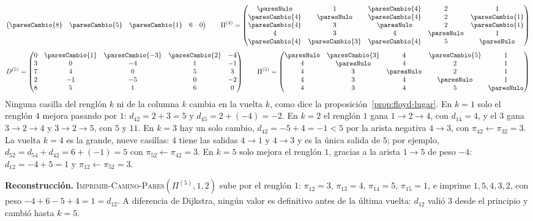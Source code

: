 \documentclass[11pt,letterpaper]{article}
\begin{document}
\begin{ejemplo}
{\[\begin{pmatrix}
    \paresCambio{8} & \paresCambio{5} & \paresCambio{1} & 6 & 0
  \end{pmatrix}
  \qquad
  \Pi^{(4)} = \begin{pmatrix}
    \paresNulo & 1 & \paresCambio{4} & 2 & 1 \\
    \paresCambio{4} & \paresNulo & \paresCambio{4} & 2 & \paresCambio{1} \\
    \paresCambio{4} & 3 & \paresNulo & 2 & \paresCambio{1} \\
    4 & 3 & 4 & \paresNulo & 1 \\
    \paresCambio{4} & \paresCambio{3} & \paresCambio{4} & 5 & \paresNulo
  \end{pmatrix}
  \]
  \[
  D^{(5)} = \begin{pmatrix}
    0 & \paresCambio{1} & \paresCambio{-3} & \paresCambio{2} & -4 \\
    3 & 0 & -4 & 1 & -1 \\
    7 & 4 & 0 & 5 & 3 \\
    2 & -1 & -5 & 0 & -2 \\
    8 & 5 & 1 & 6 & 0
  \end{pmatrix}
  \qquad
  \Pi^{(5)} = \begin{pmatrix}
    \paresNulo & \paresCambio{3} & 4 & \paresCambio{5} & 1 \\
    4 & \paresNulo & 4 & 2 & 1 \\
    4 & 3 & \paresNulo & 2 & 1 \\
    4 & 3 & 4 & \paresNulo & 1 \\
    4 & 3 & 4 & 5 & \paresNulo
  \end{pmatrix}
  \]
  }%
  Ninguna casilla del renglón $k$ ni de la columna $k$ cambia en la
  vuelta $k$, como dice la proposición~\ref{prop:floyd-lugar}. En
  $k = 1$ solo el renglón $4$ mejora pasando por $1$:
  $d_{42} = 2 + 3 = 5$ y $d_{45} = 2 + (-4) = -2$. En $k = 2$ el
  renglón $1$ gana $1 \to 2 \to 4$, con $d_{14} = 4$, y el $3$ gana
  $3 \to 2 \to 4$ y $3 \to 2 \to 5$, con $5$ y $11$. En $k = 3$ hay un
  solo cambio, $d_{42} = -5 + 4 = -1 < 5$ por la arista negativa
  $4 \to 3$, con $\pi_{42} \gets \pi_{32} = 3$. La vuelta $k = 4$ es la
  grande, nueve casillas: $4$ tiene las salidas $4 \to 1$ y $4 \to 3$
  y es la única salida de $5$; por ejemplo,
  $d_{52} = d_{54} + d_{42} = 6 + (-1) = 5$ con
  $\pi_{52} \gets \pi_{42} = 3$. En $k = 5$ solo mejora el renglón
  $1$, gracias a la arista $1 \to 5$ de peso $-4$:
  $d_{12} = -4 + 5 = 1$ y $\pi_{12} \gets \pi_{52} = 3$.

  \textbf{Reconstrucción.} \textsc{Imprimir-Camino-Pares}$(\Pi^{(5)},
  1, 2)$ sube por el renglón $1$: $\pi_{12} = 3$, $\pi_{13} = 4$,
  $\pi_{14} = 5$, $\pi_{15} = 1$, e imprime $1, 5, 4, 3, 2$, con peso
  $-4 + 6 - 5 + 4 = 1 = d_{12}$. A diferencia de Dijkstra, ningún
  valor es definitivo antes de la última vuelta: $d_{12}$ valió $3$
  desde el principio y cambió hasta $k = 5$.
\end{ejemplo}
\end{document}
